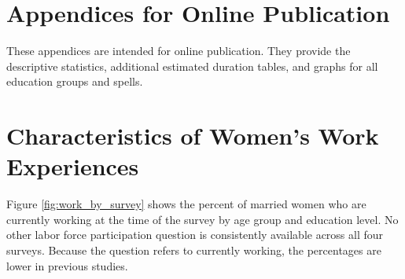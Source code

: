 \documentclass[12pt,letterpaper]{article}
\begin{document}
\renewcommand\thefigure{\thesection.\arabic{figure}}    
\renewcommand\thetable{\thesection.\arabic{table}}    

\section*{Appendices for Online Publication}

These appendices are intended for online publication.
They provide the descriptive statistics, additional
estimated duration tables, and graphs for all 
education groups and spells.

\clearpage
\newpage

\section{Characteristics of Women's Work Experiences}


\setcounter{figure}{0}
\setcounter{table}{0}

Figure \ref{fig:work_by_survey} shows the percent of married women who are 
currently working at the time of the survey by age group and education level.
No other labor force participation question is consistently available across all 
four surveys. 
Because the question refers to currently working, the percentages are lower in previous
studies. 

\captionsetup[figure]{skip = 10pt}
\end{document}
